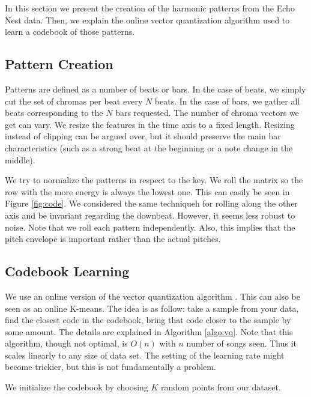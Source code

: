 \documentclass{article}
\begin{document}
In this section we present the creation of the harmonic patterns from
the Echo Nest data. Then, we explain the online vector quantization algorithm
used to learn a codebook of those patterns.

\subsection{Pattern Creation}
Patterns are defined as a number of beats or bars. In the case of beats,
we simply cut the set of chromas per beat every $N$ beats. In the case
of bars, we gather all beats corresponding to the $N$ bars requested.
The number of chroma vectors we get can vary. We resize the features in the
time axis to a fixed length. Resizing instead of clipping can be argued over, 
but it should
preserve the main bar characteristics (such as a strong beat at the beginning
or a note change in the middle).

We try to normalize the patterns in respect to the key. We roll the matrix
so the row with the more energy is always the lowest one. This can easily be
seen in Figure \ref{fig:code}. We considered the same techniqueh for rolling
along the other axis and be invariant regarding the downbeat. However, it
seems less robust to noise. Note that we roll each pattern independently.
Also, this implies that the pitch envelope is important rather than the actual 
pitches.


\subsection{Codebook Learning}
We use an online version of the vector quantization algorithm 
\cite{Gersho1991}. This can also be seen as an online K-means.
The idea is as follow: take a sample from your data, find the closest
code in the codebook, bring that code closer to the sample by some amount.
The details are explained in Algorithm \ref{algo:vq}. Note that this
algorithm, though not optimal, is $O(n)$ with $n$ number of songs seen.
Thus it scales linearly to any size of data set. The setting of the learning
rate might become trickier, but this is not fundamentally a problem.

We initialize the codebook by choosing $K$ random points from our dataset.
\end{document}
